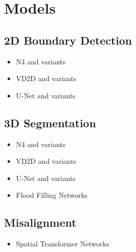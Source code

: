 \chapter{Models}

\section{2D Boundary Detection}

\begin{itemize}
	\item N4 and variants
	\item VD2D and variants
	\item U-Net and variants
\end{itemize}

\section{3D Segmentation}

\begin{itemize}
	\item N4 and variants
	\item VD2D and variants
	\item U-Net and variants
	\item Flood Filling Networks
\end{itemize}

\section{Misalignment}

\begin{itemize}
	\item Spatial Transformer Networks
\end{itemize}